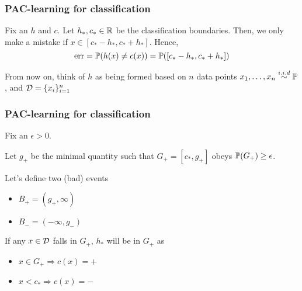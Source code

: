 \documentclass[12pt]{beamer}
\begin{document}
\begin{frame}[fragile]
\frametitle{PAC-learning for classification}
  Fix an $h$ and $c$.   Let $h_*,c_* \in \R$ be the 
classification boundaries. Then, we only make a mistake
if $x \in [c_*-h_*,c_*+h_*]$.  Hence, 
\[
\textrm{err}=\P(h(x) \neq c(x))= \P([c_*-h_*,c_*+h_*])
\]



\vsp
{} From now on, think of 
$h$ as being formed based on $n$ data points $x_1,\ldots,x_n \stackrel{i.i.d}{\sim} \P$, and $\data = \{x_i\}_{i=1}^n$
\end{frame}

\begin{frame}[fragile]
\frametitle{PAC-learning for classification}
%
%
%

 Fix an $\epsilon > 0$.

Let $g_+$ be the minimal quantity such that 
$G_+ = [c_*,g_+]$ obeys $\P(G_+) \geq \epsilon$.  
%
%

\vsp

Let's define two (bad) events 

\begin{itemize}
\item $B_+ = (g_+,\infty)$
\item $B_- = (-\infty, g_-)$
\end{itemize}
\vsp

 If any $x \in \data$ falls in $G_+$, $h_*$ will be in $G_+$ as 
\begin{itemize}
\item[] $x \in G_+ \Rightarrow c(x) = +$
\item[] $x < c_* \Rightarrow c(x) = -$
\end{itemize}
\end{frame}
\end{document}
